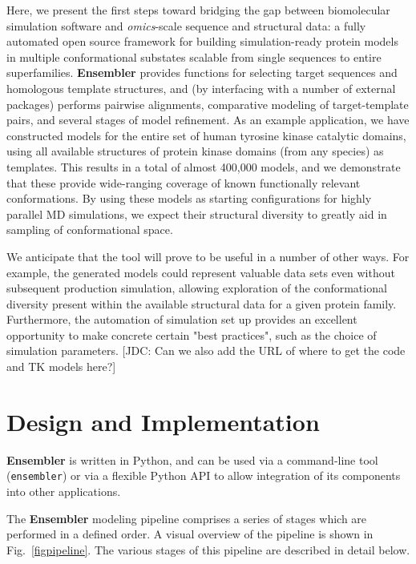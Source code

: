 \documentclass[aps,pre,twocolumn,nofootinbib,superscriptaddress,linenumbers]{revtex4-1}
\begin{document}
Here, we present the first steps toward bridging the gap between biomolecular simulation software and \emph{omics}-scale sequence and structural data: a fully automated open source framework for building simulation-ready protein models in multiple conformational substates scalable from single sequences to entire superfamilies.
{\bf Ensembler} provides functions for selecting target sequences and homologous template structures, and (by interfacing with a number of external packages) performs pairwise alignments, comparative modeling of target-template pairs, and several stages of model refinement.
As an example application, we have constructed models for the entire set of human tyrosine kinase catalytic domains, using all available structures of protein kinase domains (from any species) as templates.
This results in a total of almost 400,000 models, and we demonstrate that these provide wide-ranging coverage of known functionally relevant conformations.
By using these models as starting configurations for highly parallel MD simulations, we expect their structural diversity to greatly aid in sampling of conformational space.

We anticipate that the tool will prove to be useful in a number of other ways.
For example, the generated models could represent valuable data sets even without subsequent production simulation, allowing exploration of the conformational diversity present within the available structural data for a given protein family.
Furthermore, the automation of simulation set up provides an excellent opportunity to make concrete certain "best practices", such as the choice of simulation parameters.
{\color{red}[JDC: Can we also add the URL of where to get the code and TK models here?]}

\section{Design and Implementation}

{\bf Ensembler} is written in Python, and can be used via a command-line tool ({\tt ensembler}) or via a flexible Python API to allow integration of its components into other applications.

The {\bf Ensembler} modeling pipeline comprises a series of stages which are performed in a defined order. 
A visual overview of the pipeline is shown in Fig.~\ref{figpipeline}.
The various stages of this pipeline are described in detail below.
\end{document}
